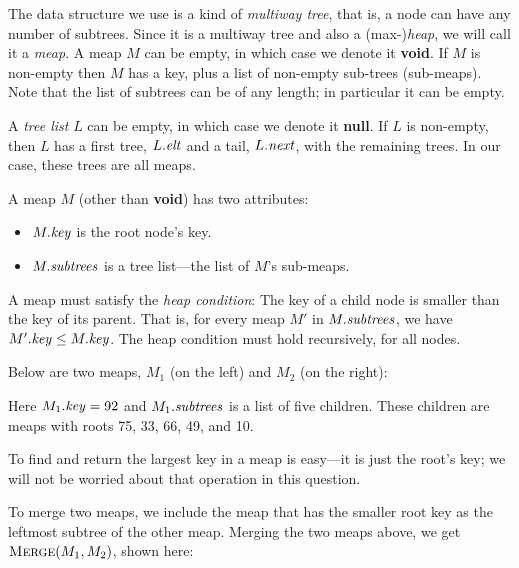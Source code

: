 \documentclass[11pt]{article}
\newcommand{\id}[1]{\mbox{\textit{#1}}}
\begin{document}
The data structure we use is a kind of \emph{multiway tree},
that is, a node can have any number of subtrees.
Since it is a multiway tree and also a (max-)\emph{heap},
we will call it a \emph{meap}.
A meap $M$ can be empty, in which case we denote it \textbf{void}.
If $M$ is non-empty then $M$ has a key, plus a list of non-empty 
sub-trees (sub-meaps).
Note that the list of subtrees can be of any length; 
in particular it can be empty.

A \emph{tree list} $L$ can be empty, in which case we denote it 
\textbf{null}.
If $L$ is non-empty, then $L$ has a first tree, $L.\id{elt}$ and
a tail, $L.\id{next}$, with the remaining trees.
In our case, these trees are all meaps.

A meap $M$ (other than \textbf{void}) has two attributes:
\begin{itemize}
\setlength{\itemsep}{-0.5ex}
\item $M.\id{key}$ is the root node's key.
\item $M.\id{subtrees}$ is a tree list---the list of $M$'s sub-meaps.
\end{itemize}
A meap must satisfy the \emph{heap condition}:
The key of a child node is smaller than the key of its parent.
That is, for every meap $M'$ in $M.\id{subtrees}$,
we have $M'.\id{key} \leq M.\id{key}$.
The heap condition must hold recursively, for all nodes.

Below are two meaps, $M_1$ (on the left) and $M_2$ (on the right):
\begin{center}
\qquad \qquad
{}
\end{center}

\vspace{1ex}\noindent
Here $M_1.\id{key} = 92$ and $M_1.\id{subtrees}$ is a list of five children.
These children are meaps with roots 75, 33, 66, 49, and 10.

To find and return the largest key in a meap is easy---it is just the root's
key; we will not be worried about that operation in this question.

To merge two meaps, we include the meap that has the smaller root key
as the leftmost subtree of the other meap.
Merging the two meaps above, we get $\textsc{Merge}(M_1,M_2)$,
shown here:
\begin{center}
\end{center}
\end{document}

